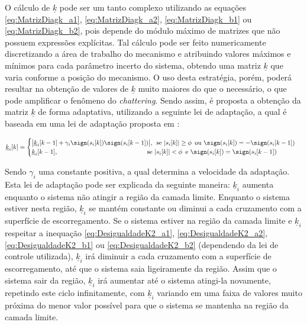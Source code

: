 \documentclass[]{politex}
\begin{document}
O cálculo de $\underline{k}$ pode ser um tanto complexo utilizando as equações \eqref{eq:MatrizDiagk_a1}, \eqref{eq:MatrizDiagk_a2}, \eqref{eq:MatrizDiagk_b1} ou \eqref{eq:MatrizDiagk_b2}, pois depende do módulo máximo de matrizes que não possuem expressões explícitas. Tal cálculo pode ser feito numericamente discretizando a área de trabalho do mecanismo e atribuindo valores máximos e mínimos para cada parâmetro incerto do sistema, obtendo uma matriz $\underline{k}$ que varia conforme a posição do mecanismo. O uso desta estratégia, porém, poderá resultar na obtenção de valores de $\underline{k}$ muito maiores do que o necessário, o que pode amplificar o fenômeno do \emph{chattering}. Sendo assim, é proposta a obtenção da matriz $\underline{k}$ de forma adaptativa, utilizando a seguinte lei de adaptação, a qual é baseada em uma lei de adaptação proposta em \cite{Monsees}:

\begin{equation}
\underline{k}_i[k] = \begin{cases}
\big| \underline{k}_i[k-1] + \gamma_i \sign(s_i [k]) \sign(s_i [k-1])  \big|, \, \text{ se } |s_i[k]| \geq \phi \, \text{ ou }  \sign(s_i [k]) = - \sign(s_i [k-1]) \\
\underline{k}_i[k-1], \;\;\;\;\;\;\;\;\;\;\;\;\;\;\;\;\;\;\;\;\;\;\;\;\;\;\;\;\;\;\;\;\;\;\;\;\;\;\;\;\;\;\;\;\;\;\;\;\;\, \text{ se } |s_i[k]| < \phi \, \text{ e }  \sign(s_i [k]) = \sign(s_i [k-1]) \\
 
\end{cases}
\end{equation}

Sendo $\gamma_i$ uma constante positiva, a qual determina a velocidade da adaptação. \\

Esta lei de adaptação pode ser explicada da seguinte maneira: $\underline{k}_i$ aumenta enquanto o sistema não atingir a região da camada limite. Enquanto o sistema estiver nesta região, $\underline{k}_i$ se mantém constante ou diminui a cada cruzamento com a superfície de escorregamento. Se o sistema estiver na região da camada limite e $\underline{k}_i$ respeitar a inequação \eqref{eq:DesigualdadeK2_a1}, \eqref{eq:DesigualdadeK2_a2}, \eqref{eq:DesigualdadeK2_b1} ou \eqref{eq:DesigualdadeK2_b2} (dependendo da lei de controle utilizada), $\underline{k}_i$ irá diminuir a cada cruzamento com a superfície de escorregamento, até que o sistema saia ligeiramente da região. Assim que o sistema sair da região, $\underline{k}_i$ irá aumentar até o sistema atingi-la novamente, repetindo este ciclo infinitamente, com $\underline{k}_i$ variando em uma faixa de valores muito próxima do menor valor possível para que o sistema se mantenha na região da camada limite.
\end{document}
